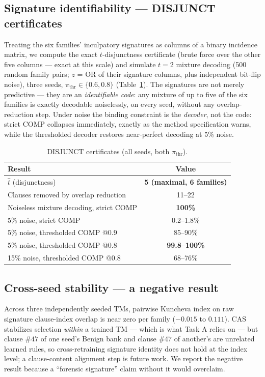 \documentclass[conference]{IEEEtran}
\begin{document}
\subsection{Signature identifiability --- DISJUNCT certificates}
\label{sec:disjunct}
Treating the six families' inculpatory signatures as columns of a binary
incidence matrix, we compute the exact $t$-disjunctness certificate (brute
force over the other five columns --- exact at this scale) and simulate
$t{=}2$ mixture decoding (500 random family pairs; $z$ = OR of their
signature columns, plus independent bit-flip noise), three seeds,
$\pi_{\mathrm{thr}} \in \{0.6, 0.8\}$ (Table~\ref{tab:disjunct}). The
signatures are not merely predictive --- they are an \emph{identifiable
code}: any mixture of up to five of the six families is exactly decodable
noiselessly, on every seed, without any overlap-reduction step. Under noise
the binding constraint is the \emph{decoder}, not the code: strict COMP
collapses immediately, exactly as the method specification warns, while the
thresholded decoder restores near-perfect decoding at 5\% noise.

\begin{table}[t]
\centering
\caption{DISJUNCT certificates (all seeds, both $\pi_{\mathrm{thr}}$).}
\label{tab:disjunct}
\begin{tabular}{lc}
\toprule
Result & Value \\
\midrule
$\hat{t}$ (disjunctness) & \textbf{5 (maximal, 6 families)} \\
Clauses removed by overlap reduction & 11--22 \\
Noiseless mixture decoding, strict COMP & \textbf{100\%} \\
5\% noise, strict COMP & 0.2--1.8\% \\
5\% noise, thresholded COMP @0.9 & 85--90\% \\
5\% noise, thresholded COMP @0.8 & \textbf{99.8--100\%} \\
15\% noise, thresholded COMP @0.8 & 68--76\% \\
\bottomrule
\end{tabular}
\end{table}

\subsection{Cross-seed stability --- a negative result}
\label{sec:stability}
Across three independently seeded TMs, pairwise Kuncheva index on raw
signature clause-index overlap is near zero per family ($-0.015$ to $0.111$).
CAS stabilizes selection \emph{within} a trained
TM --- which is what Task A relies on --- but clause $\#47$ of one seed's
Benign bank and clause $\#47$ of another's are unrelated learned rules, so
cross-retraining signature identity does not hold at the index level; a
clause-content alignment step is future work. We report the negative result
because a ``forensic signature'' claim without it would overclaim.
\end{document}
